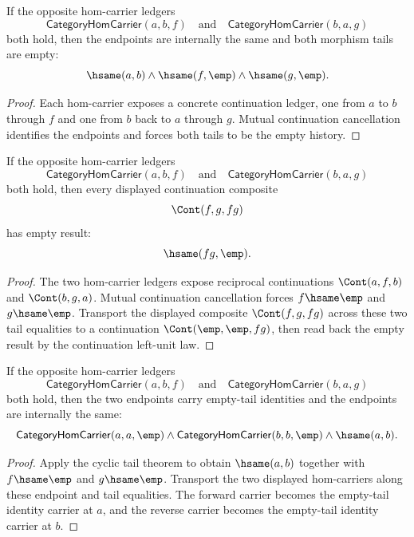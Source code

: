 \begin{theorem}
\label{thm:category-hom-carrier-cycle-tails-empty}
If the opposite hom-carrier ledgers
$$
\mathsf{CategoryHomCarrier}(a,b,f)
\quad\text{and}\quad
\mathsf{CategoryHomCarrier}(b,a,g)
$$
both hold, then the endpoints are internally the same and both morphism tails
are empty:
$$
\hsame(a,b)\land \hsame(f,\emp)\land \hsame(g,\emp).
$$
\end{theorem}
\begin{proof}
Each hom-carrier exposes a concrete continuation ledger, one from $a$ to $b$
through $f$ and one from $b$ back to $a$ through $g$. Mutual continuation
cancellation identifies the endpoints and forces both tails to be the empty
history.
\end{proof}

\begin{theorem}
\label{thm:category-hom-carrier-comp-cycle-result-empty}
If the opposite hom-carrier ledgers
$$
\mathsf{CategoryHomCarrier}(a,b,f)
\quad\text{and}\quad
\mathsf{CategoryHomCarrier}(b,a,g)
$$
both hold, then every displayed continuation composite
$$
\Cont(f,g,fg)
$$
has empty result:
$$
\hsame(fg,\emp).
$$
\end{theorem}
\begin{proof}
The two hom-carrier ledgers expose reciprocal continuations
$\Cont(a,f,b)$ and $\Cont(b,g,a)$. Mutual continuation cancellation forces
$f\hsame\emp$ and $g\hsame\emp$. Transport the displayed composite
$\Cont(f,g,fg)$ across these two tail equalities to a continuation
$\Cont(\emp,\emp,fg)$, then read back the empty result by the continuation
left-unit law.
\end{proof}

\begin{theorem}
\label{thm:category-hom-carrier-cycle-identity-carriers}
If the opposite hom-carrier ledgers
$$
\mathsf{CategoryHomCarrier}(a,b,f)
\quad\text{and}\quad
\mathsf{CategoryHomCarrier}(b,a,g)
$$
both hold, then the two endpoints carry empty-tail identities and the endpoints
are internally the same:
$$
\mathsf{CategoryHomCarrier}(a,a,\emp)\land
\mathsf{CategoryHomCarrier}(b,b,\emp)\land
\hsame(a,b).
$$
\end{theorem}
\begin{proof}
Apply the cyclic tail theorem to obtain $\hsame(a,b)$ together with
$f\hsame\emp$ and $g\hsame\emp$. Transport the two displayed hom-carriers along
these endpoint and tail equalities. The forward carrier becomes the empty-tail
identity carrier at $a$, and the reverse carrier becomes the empty-tail
identity carrier at $b$.
\end{proof}

